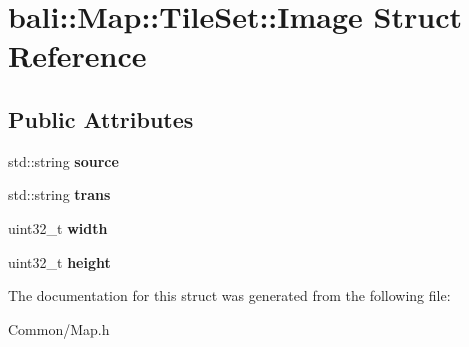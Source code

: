\hypertarget{structbali_1_1_map_1_1_tile_set_1_1_image}{\section{bali\-:\-:Map\-:\-:Tile\-Set\-:\-:Image Struct Reference}
\label{structbali_1_1_map_1_1_tile_set_1_1_image}
}
\subsection*{Public Attributes}
\begin{DoxyCompactItemize}
\item 
\hypertarget{structbali_1_1_map_1_1_tile_set_1_1_image_afd92e78e27fca26c4896fc9c6f9cdb9f}{std\-::string {\bfseries source}}\label{structbali_1_1_map_1_1_tile_set_1_1_image_afd92e78e27fca26c4896fc9c6f9cdb9f}

\item 
\hypertarget{structbali_1_1_map_1_1_tile_set_1_1_image_a9c4057a47e35364094595c8d81178eee}{std\-::string {\bfseries trans}}\label{structbali_1_1_map_1_1_tile_set_1_1_image_a9c4057a47e35364094595c8d81178eee}

\item 
\hypertarget{structbali_1_1_map_1_1_tile_set_1_1_image_ab8f26007b3bbb2794a2ae592c37b40c8}{uint32\-\_\-t {\bfseries width}}\label{structbali_1_1_map_1_1_tile_set_1_1_image_ab8f26007b3bbb2794a2ae592c37b40c8}

\item 
\hypertarget{structbali_1_1_map_1_1_tile_set_1_1_image_a4e439d4006267fac8fcd15a853405f4b}{uint32\-\_\-t {\bfseries height}}\label{structbali_1_1_map_1_1_tile_set_1_1_image_a4e439d4006267fac8fcd15a853405f4b}

\end{DoxyCompactItemize}


The documentation for this struct was generated from the following file\-:\begin{DoxyCompactItemize}
\item 
Common/Map.\-h\end{DoxyCompactItemize}
